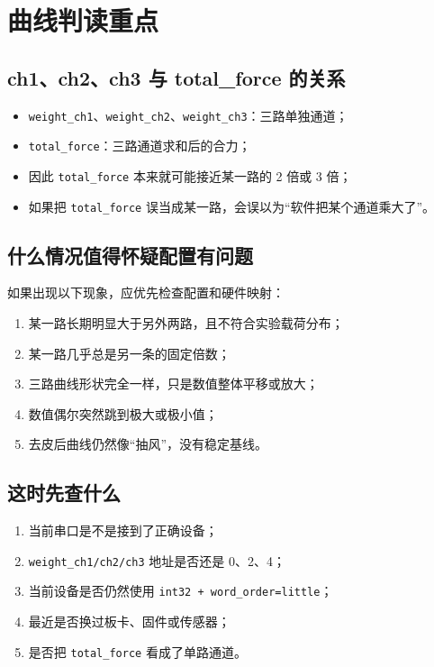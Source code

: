 \documentclass[11pt,a4paper]{ctexart}
\begin{document}
\section{曲线判读重点}

\subsection{ch1、ch2、ch3 与 total\_force 的关系}

\begin{itemize}[leftmargin=2em]
  \item \texttt{weight\_ch1}、\texttt{weight\_ch2}、\texttt{weight\_ch3}：三路单独通道；
  \item \texttt{total\_force}：三路通道求和后的合力；
  \item 因此 \texttt{total\_force} 本来就可能接近某一路的 2 倍或 3 倍；
  \item 如果把 \texttt{total\_force} 误当成某一路，会误以为“软件把某个通道乘大了”。
\end{itemize}

\subsection{什么情况值得怀疑配置有问题}

如果出现以下现象，应优先检查配置和硬件映射：

\begin{enumerate}[leftmargin=2em]
  \item 某一路长期明显大于另外两路，且不符合实验载荷分布；
  \item 某一路几乎总是另一条的固定倍数；
  \item 三路曲线形状完全一样，只是数值整体平移或放大；
  \item 数值偶尔突然跳到极大或极小值；
  \item 去皮后曲线仍然像“抽风”，没有稳定基线。
\end{enumerate}

\subsection{这时先查什么}

\begin{enumerate}[leftmargin=2em]
  \item 当前串口是不是接到了正确设备；
  \item \texttt{weight\_ch1/ch2/ch3} 地址是否还是 0、2、4；
  \item 当前设备是否仍然使用 \texttt{int32 + word\_order=little}；
  \item 最近是否换过板卡、固件或传感器；
  \item 是否把 \texttt{total\_force} 看成了单路通道。
\end{enumerate}
\end{document}
